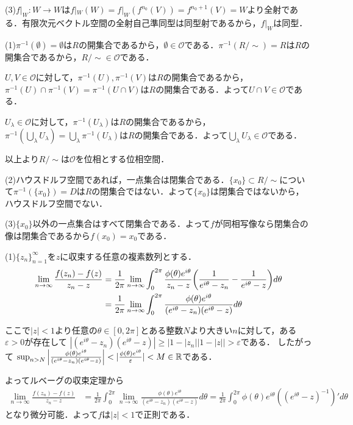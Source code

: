 \documentclass[
		book,
		head_space=20mm,
		foot_space=20mm,
		gutter=10mm,
		line_length=190mm
]{jlreq}
\begin{document}
(3)$f|_W\colon W \rightarrow W$は$f|_W(W)=f|_W(f^{n_0}(V))=f^{n_0+1}(V)=W$より全射である．有限次元ベクトル空間の全射自己準同型は同型射であるから，$f|_W$は同型．

(1)$\pi^{-1}(\emptyset)=\emptyset$は$R$の開集合であるから，$\emptyset \in \mathcal{O}$である．$\pi^{-1}(R/\sim)=R$は$R$の開集合であるから，$R/\sim \in \mathcal{O}$である．

$U,V \in \mathcal{O}$に対して，$\pi^{-1}(U),\pi^{-1}(V)$は$R$の開集合であるから，$\pi^{-1}(U)\cap \pi^{-1}(V)=\pi^{-1}(U\cap V)$は$R$の開集合である．よって$U\cap V \in \mathcal{O}$である．

$U_\lambda \in \mathcal{O}$に対して，$\pi^{-1}(U_\lambda)$は$R$の開集合であるから，$\pi^{-1}(\bigcup_\lambda U_\lambda)=\bigcup_\lambda \pi^{-1}(U_\lambda)$は$R$の開集合である．よって$\bigcup_\lambda U_\lambda \in \mathcal{O}$である．

以上より$R/\sim$は$\mathcal{O}$を位相とする位相空間．

(2)ハウスドルフ空間であれば，一点集合は閉集合である．$\{x_0\}\subset R/\sim$について$\pi^{-1}(\{x_0\})=D$は$R$の閉集合ではない．よって$\{x_0\}$は閉集合ではないから，ハウスドルフ空間でない．

(3)$\{x_0\}$以外の一点集合はすべて閉集合である．よって$f$が同相写像なら閉集合の像は閉集合であるから$f(x_0)=x_0$である．

(1)$\{z_n\}_{n=1}^\infty$を$z$に収束する任意の複素数列とする．
\begin{align}
	\lim_{n \to \infty} \frac{f(z_n)-f(z)}{z_n-z}&=\frac{1}{2\pi}\lim_{n \to \infty}\int_0^{2\pi}\frac{\phi(\theta)e^{i\theta}}{z_n-z}\qty(\frac{1}{e^{i\theta}-z_n}-\frac{1}{e^{i\theta}-z})d\theta\\
	&= \frac{1}{2\pi}\lim_{n \to \infty}\int_0^{2\pi}\frac{\phi(\theta)e^{i\theta}}{({e^{i\theta}-z_n})({e^{i\theta}-z})}d\theta\\
\end{align}

ここで$|z|<1$より任意の$\theta\in [0,2\pi]$とある整数$N$より大きい$n$に対して，ある$\varepsilon>0$が存在して
$|({e^{i\theta}-z_n})({e^{i\theta}-z})|\ge|1-|z_n||1-|z||>\varepsilon$である．
したがって
$\sup_{n >N}\qty|\frac{\phi(\theta)e^{i\theta}}{({e^{i\theta}-z_n})({e^{i\theta}-z})}|<|\frac{\phi(\theta)e^{i\theta}}{\varepsilon}|<M\in \mathbb{R} $である．

よってルベーグの収束定理から
\begin{align}
	\lim_{n \to \infty} \frac{f(z_n)-f(z)}{z_n-z}&=\frac{1}{2\pi}\int_0^{2\pi}\lim_{n \to \infty}\frac{\phi(\theta)e^{i\theta}}{({e^{i\theta}-z_n})({e^{i\theta}-z})}d\theta=\frac{1}{2\pi}\int_0^{2\pi}\phi(\theta)e^{i\theta}((e^{i\theta}-z)^{-1})'d\theta
\end{align}
となり微分可能．よって$f$は$|z|<1$で正則である．
\end{document}

